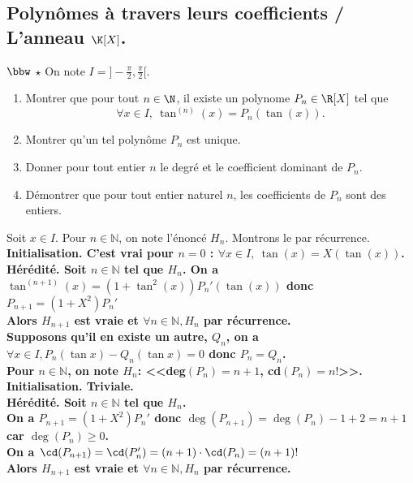 \documentclass[11pt]{article}
\begin{document}
\subsection*{Polynômes à travers leurs coefficients / L'anneau $\K[X]$.}

\begin{exercice}{$\bbw$ $\star$}{}
    On note $I=]-\frac{\pi}{2},\frac{\pi}{2}[$.
    \begin{enumerate}
        \item Montrer que pour tout $n\in\N$, il existe un polynome $P_n\in\R[X]$ tel que
        \begin{equation*}
            \forall x \in I, ~ \tan^{(n)}(x)=P_n(\tan(x)).
        \end{equation*}
        \item Montrer qu'un tel polynôme $P_n$ est unique.
        \item Donner pour tout entier $n$ le degré et le coefficient dominant de $P_n$.
        \item Démontrer que pour tout entier naturel $n$, les coefficients de $P_n$ sont des entiers.
    \end{enumerate}
    \tcblower
    \boxed{\star} Soit $x\in I$. Pour $n\in\mathbb{N}$, on note l'énoncé $H_n$. Montrons le par récurrence.\\
    \bf{Initialisation.} C'est vrai pour $n=0$ : $\forall x\in I, ~ \tan(x)=X(\tan(x))$.\\
    \bf{Hérédité.} Soit $n\in\mathbb{N}$ tel que $H_n$. On a $\tan^{(n+1)}(x)=(1+\tan^2(x))P_n'(\tan(x))$ donc $P_{n+1}=(1+X^2)P_n'$\\
    Alors $H_{n+1}$ est vraie et $\forall n\in\mathbb{N}, H_n$ par récurrence.\\
     Supposons qu'il en existe un autre, $Q_n$, on a $\forall x\in I, P_n(\tan x) - Q_n(\tan x) = 0$ donc $P_n=Q_n$.\\
     Pour $n\in\mathbb{N}$, on note $H_n$: <<deg$(P_n)=n+1$, cd$(P_n)=n!$>>.\\
    \bf{Initialisation.} Triviale.\\
    \bf{Hérédité.} Soit $n\in\mathbb{N}$ tel que $H_n$.\\
    On a $P_{n+1}=(1+X^2)P_n'$ donc $\deg(P_{n+1})=\deg(P_n)-1+2=n+1$ car $\deg(P_n)\geq0$.\\
    On a $\cd(P_{n+1})=\cd(P_n')=(n+1)\cdot\cd(P_n)=(n+1)!$\\
    Alors $H_{n+1}$ est vraie et $\forall n \in \mathbb{N}, H_n$ par récurrence.\\

\end{exercice}
\end{document}
